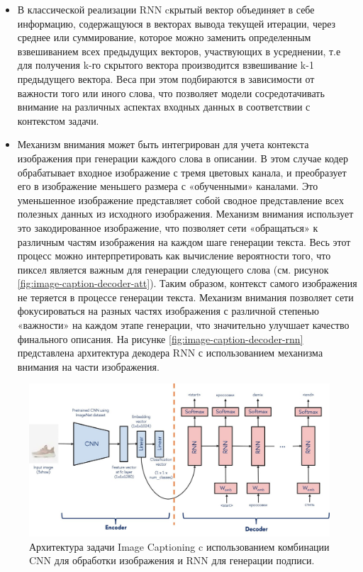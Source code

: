 \documentclass[a4paper,12pt]{extarticle}
\begin{document}
\begin{itemize}
	\item В классической реализации RNN cкрытый вектор объединяет в себе информацию, содержащуюся в векторах вывода текущей итерации, через среднее или суммирование, которое можно заменить определенным взвешиванием всех предыдущих векторов, участвующих в усреднении, т.е для получения k-го скрытого вектора производится взвешивание k-1 предыдущего вектора. Веса при этом подбираются в зависимости от важности того или иного слова, что позволяет модели сосредотачивать внимание на различных аспектах входных данных в соответствии с контекстом задачи.
	\item Механизм внимания может быть интегрирован для учета контекста изображения при генерации каждого слова в описании. В этом случае кодер обрабатывает входное изображение с тремя цветовых канала, и преобразует его в изображение меньшего размера с «обученными» каналами. Это уменьшенное изображение представляет собой сводное представление всех полезных данных из исходного изображения. Механизм внимания использует это закодированное изображение, что позволяет сети «обращаться» к различным частям изображения на каждом шаге генерации текста. Весь этот процесс можно интерпретировать как вычисление вероятности того, что пиксел является важным для генерации следующего слова (см. рисунок \ref{fig:image-caption-decoder-att}). Таким образом, контекст самого изображения не теряется в процессе генерации текста. Механизм внимания позволяет сети фокусироваться на разных частях изображения с различной степенью «важности» на каждом этапе генерации, что значительно улучшает качество финального описания. На рисунке \ref{fig:image-caption-decoder-rnn} представлена архитектура декодера RNN с использованием механизма внимания на части изображения.
\end{itemize}

\begin{figure}[ht]
	\centering
	\includegraphics[scale=1]{image-caption-cnn-rnn.png}
	\caption{Архитектура задачи Image Captioning c использованием комбинации CNN для обработки изображения и RNN для генерации подписи.}
	\label{fig:image-caption-cnn-rnn}
\end{figure}
\end{document}
